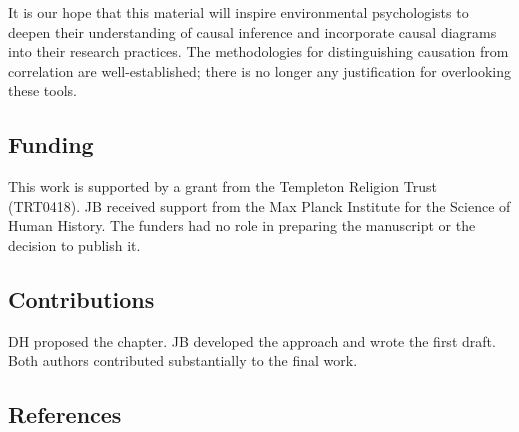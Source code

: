 \documentclass[
  singlecolumn]{article}
\begin{document}
It is our hope that this material will inspire environmental
psychologists to deepen their understanding of causal inference and
incorporate causal diagrams into their research practices. The
methodologies for distinguishing causation from correlation are
well-established; there is no longer any justification for overlooking
these tools.

\newpage{}

\subsection{Funding}\label{funding}

This work is supported by a grant from the Templeton Religion Trust
(TRT0418). JB received support from the Max Planck Institute for the
Science of Human History. The funders had no role in preparing the
manuscript or the decision to publish it.

\subsection{Contributions}\label{contributions}

DH proposed the chapter. JB developed the approach and wrote the first
draft. Both authors contributed substantially to the final work.

\subsection{References}\label{references}
\end{document}
